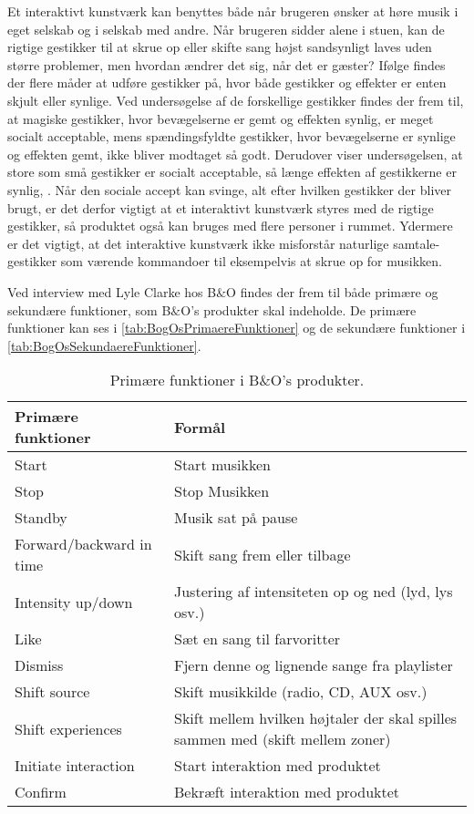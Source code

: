 Et interaktivt kunstværk kan benyttes både  når brugeren ønsker at høre musik i eget selskab og i selskab med andre. Når brugeren sidder alene i stuen, kan de rigtige gestikker til at skrue op eller skifte sang højst sandsynligt laves uden større problemer, men hvordan ændrer det sig, når det er gæster? Ifølge \textcite[ss. 276-277]{PDF:WouldYouDoThat} findes der flere måder at udføre gestikker på, hvor både gestikker og effekter er enten skjult eller synlige. Ved undersøgelse af de forskellige gestikker findes der frem til, at magiske gestikker, hvor bevægelserne er gemt og effekten synlig, er meget socialt acceptable, mens spændingsfyldte gestikker, hvor bevægelserne er synlige og effekten gemt, ikke bliver modtaget så godt. Derudover viser undersøgelsen, at store som små gestikker er socialt acceptable, så længe effekten af gestikkerne er synlig, \parencite[s. 278]{PDF:WouldYouDoThat}. Når den sociale accept kan svinge, alt efter hvilken gestikker der bliver brugt, er det derfor vigtigt at et interaktivt kunstværk styres med de rigtige gestikker, så produktet også kan bruges med flere personer i rummet. Ydermere er det vigtigt, at det interaktive kunstværk ikke misforstår naturlige samtale-gestikker som værende kommandoer til eksempelvis at skrue op for musikken. 

Ved interview med Lyle Clarke hos B$\&$O findes der frem til både primære og sekundære funktioner, som B$\&$O's produkter skal indeholde. De primære funktioner kan ses i \autoref{tab:BogOsPrimaereFunktioner} og de sekundære funktioner i \autoref{tab:BogOsSekundaereFunktioner}.

%
\begin{table}[H]
	\centering
	\begin{tabular}{ | l | p{8cm} |}
		\hline
		\multicolumn{1}{|l|}{\textbf{Primære funktioner}} & \multicolumn{1}{l|}{\textbf{Formål}} \\ \hline
		Start & Start musikken \\ \hline
		Stop & Stop Musikken \\ \hline
		Standby & Musik sat på pause \\ \hline
		Forward/backward in time & Skift sang frem eller tilbage \\ \hline
		Intensity up/down & Justering af intensiteten op og ned (lyd, lys osv.) \\ \hline
		Like & Sæt en sang til farvoritter \\ \hline
		Dismiss & Fjern denne og lignende sange fra playlister \\ \hline
		Shift source & Skift musikkilde (radio, CD, AUX osv.) \\ \hline
		Shift experiences & Skift mellem hvilken højtaler der skal spilles sammen med (skift mellem zoner) \\ \hline
		Initiate interaction & Start interaktion med produktet \\ \hline
		Confirm & Bekræft interaktion med produktet \\ \hline
	\end{tabular}
	\caption{Primære funktioner i B$\&$O's produkter.}
	\label{tab:BogOsPrimaereFunktioner}
\end{table}
\noindent
%


